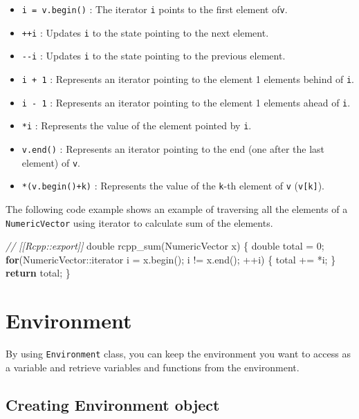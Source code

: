\documentclass[]{book}
\newenvironment{Shaded}{\begin{snugshade}}{\end{snugshade}}
\newcommand{\DataTypeTok}[1]{\textcolor[rgb]{0.13,0.29,0.53}{#1}}
\newcommand{\DecValTok}[1]{\textcolor[rgb]{0.00,0.00,0.81}{#1}}
\newcommand{\CommentTok}[1]{\textcolor[rgb]{0.56,0.35,0.01}{\textit{#1}}}
\newcommand{\ControlFlowTok}[1]{\textcolor[rgb]{0.13,0.29,0.53}{\textbf{#1}}}
\newcommand{\NormalTok}[1]{#1}
\providecommand{\tightlist}{%
  \setlength{\itemsep}{0pt}\setlength{\parskip}{0pt}}
\theoremstyle{definition}
\theoremstyle{definition}
\theoremstyle{remark}
\begin{document}
\begin{itemize}
\tightlist
\item
  \texttt{i\ =\ v.begin()} : The iterator \texttt{i} points to the first
  element of\texttt{v}.
\item
  \texttt{++i} : Updates \texttt{i} to the state pointing to the next
  element.
\item
  \texttt{-\/-i} : Updates \texttt{i} to the state pointing to the
  previous element.
\item
  \texttt{i\ +\ 1} : Represents an iterator pointing to the element 1
  elements behind of \texttt{i}.
\item
  \texttt{i\ -\ 1} : Represents an iterator pointing to the element 1
  elements ahead of \texttt{i}.
\item
  \texttt{*i} : Represents the value of the element pointed by
  \texttt{i}.
\item
  \texttt{v.end()} : Represents an iterator pointing to the end (one
  after the last element) of \texttt{v}.
\item
  \texttt{*(v.begin()+k)} : Represents the value of the \texttt{k}-th
  element of \texttt{v} (\texttt{v{[}k{]}}).
\end{itemize}

The following code example shows an example of traversing all the
elements of a \texttt{NumericVector} using iterator to calculate sum of
the elements.

\begin{Shaded}
\begin{Highlighting}[]
\CommentTok{// [[Rcpp::export]]}
\DataTypeTok{double}\NormalTok{ rcpp_sum(NumericVector x) \{}
  \DataTypeTok{double}\NormalTok{ total = }\DecValTok{0}\NormalTok{;}
  \ControlFlowTok{for}\NormalTok{(NumericVector::iterator i = x.begin(); i != x.end(); ++i) \{}
\NormalTok{    total += *i;}
\NormalTok{  \}}
  \ControlFlowTok{return}\NormalTok{ total;}
\NormalTok{\}}
\end{Highlighting}
\end{Shaded}

\chapter{Environment}\label{environment-1}

By using \texttt{Environment} class, you can keep the environment you
want to access as a variable and retrieve variables and functions from
the environment.

\section{Creating Environment object}\label{creating-environment-object}
\end{document}
